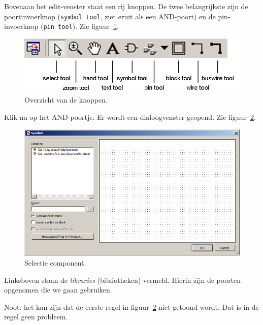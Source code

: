 \documentclass[a4paper,12pt,fleqn,twoside]{book}
\def\tutpicscale{0.455}
\newcommand{\naam}[1]{\texttt{#1}}
\begin{document}
Bovenaan het edit-venster staat een rij knoppen. De twee belangrijkste zijn
de poortinvoerknop (\naam{symbol tool}, ziet eruit als een AND-poort) en
de pin-invoerknop (\naam{pin tool}).
Zie figuur~\ref{fig:021schematictoolbarcooked}. 

\begin{figure}[H]
\centering
\includegraphics[scale=\tutpicscale]{021schematictoolbarcooked}
\caption{Overzicht van de knoppen.}
\label{fig:021schematictoolbarcooked}
\end{figure}

Klik nu op het AND-poortje. Er wordt een dialoogvenster geopend.
Zie figuur~\ref{fig:022symbolselection}.

\begin{figure}[H]
\centering
\includegraphics[scale=\tutpicscale]{022symbolselection}
\caption{Selectie component.}
\label{fig:022symbolselection}
\end{figure}

Linksboven staan de \textsl{libraries} (bibliotheken) vermeld. Hierin zijn de
poorten opgenomen die we gaan gebruiken.

Noot: het kan zijn dat de eerste regel in figuur~\ref{fig:022symbolselection}
niet getoond wordt. Dat is in de regel geen probleem.
\end{document}
